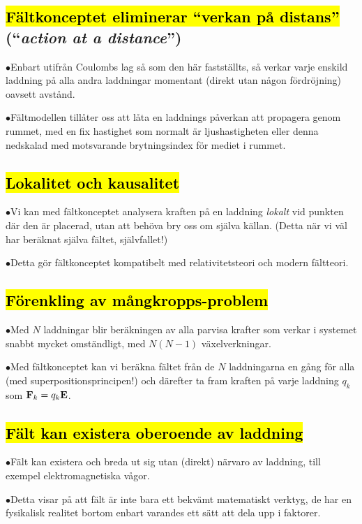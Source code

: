 {\subsection{{\hl{F{\"a}ltkonceptet eliminerar ``verkan p{\aa} distans''}}
  (``{\it action at a distance}'')}
\item{$\bullet$}{Enbart utifr{\aa}n Coulombs lag s{\aa} som den h{\"a}r
  fastst{\"a}llts, s{\aa} verkar varje enskild laddning p{\aa} alla andra
  laddningar momentant (direkt utan n{\aa}gon f{\"o}rdr{\"o}jning) oavsett
  avst{\aa}nd.}
\item{$\bullet$}{F{\"a}ltmodellen till{\aa}ter oss att l{\aa}ta en laddnings
  p{\aa}verkan att propagera genom rummet, med en fix hastighet som normalt
  {\"a}r ljushastigheten  eller denna nedskalad med
  motsvarande brytningsindex  f{\"o}r mediet i rummet.}

\subsection{\hl{Lokalitet och kausalitet}}
\item{$\bullet$}{Vi kan med f{\"a}ltkonceptet analysera kraften p{\aa} en
  laddning {\it lokalt} vid punkten d{\"a}r den {\"a}r placerad, utan att
  beh{\"o}va bry oss om sj{\"a}lva k{\"a}llan. (Detta n{\"a}r vi v{\"a}l
  har ber{\"a}knat sj{\"a}lva f{\"a}ltet, sj{\"a}lvfallet!)}
\item{$\bullet$}{Detta g{\"o}r f{\"a}ltkonceptet kompatibelt med
  relativitetsteori  och modern
  f{\"a}ltteori.}

\subsection{\hl{F{\"o}renkling av m{\aa}ngkropps-problem}}
\item{$\bullet$}{Med $N$ laddningar blir ber{\"a}kningen av alla parvisa
  krafter som verkar i systemet snabbt mycket omst{\"a}ndligt, med $N(N-1)$
  v{\"a}xelverkningar.}
\item{$\bullet$}{Med f{\"a}ltkonceptet kan vi ber{\"a}kna f{\"a}ltet fr{\aa}n
  de $N$ laddningarna en g{\aa}ng f{\"o}r alla (med superpositionsprincipen!)
  och d{\"a}refter ta fram kraften p{\aa} varje laddning $q_k$ som
  ${\bf F}_k=q_k{\bf E}$.}

\subsection{\hl{F{\"a}lt kan existera oberoende av laddning}}
\item{$\bullet$}{F{\"a}lt kan existera och breda ut sig utan (direkt)
  n{\"a}rvaro av laddning, till exempel elektromagnetiska v{\aa}gor.}
\item{$\bullet$}{Detta visar p{\aa} att f{\"a}lt {\"a}r inte bara ett
  bekv{\"a}mt matematiskt verktyg, de har en fysikalisk realitet bortom
  enbart varandes ett s{\"a}tt att dela upp  i
  faktorer.}
\vfill\eject

}
